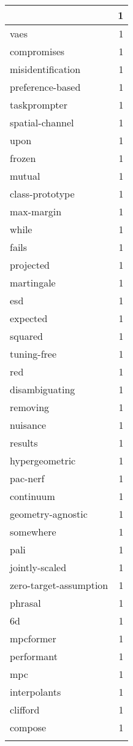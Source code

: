 \begin{table}[h]
\begin{tabular}{|l|r|}
{\hline
mmvae & 1 \\
\hline
vaes & 1 \\
\hline
compromises & 1 \\
\hline
misidentification & 1 \\
\hline
preference-based & 1 \\
\hline
taskprompter & 1 \\
\hline
spatial-channel & 1 \\
\hline
upon & 1 \\
\hline
frozen & 1 \\
\hline
mutual & 1 \\
\hline
class-prototype & 1 \\
\hline
max-margin & 1 \\
\hline
while & 1 \\
\hline
fails & 1 \\
\hline
projected & 1 \\
\hline
martingale & 1 \\
\hline
esd & 1 \\
\hline
expected & 1 \\
\hline
squared & 1 \\
\hline
tuning-free & 1 \\
\hline
red & 1 \\
\hline
disambiguating & 1 \\
\hline
removing & 1 \\
\hline
nuisance & 1 \\
\hline
results & 1 \\
\hline
hypergeometric & 1 \\
\hline
pac-nerf & 1 \\
\hline
continuum & 1 \\
\hline
geometry-agnostic & 1 \\
\hline
somewhere & 1 \\
\hline
pali & 1 \\
\hline
jointly-scaled & 1 \\
\hline
zero-target-assumption & 1 \\
\hline
phrasal & 1 \\
\hline
6d & 1 \\
\hline
mpcformer & 1 \\
\hline
performant & 1 \\
\hline
mpc & 1 \\
\hline
interpolants & 1 \\
\hline
clifford & 1 \\
\hline
compose & 1 \\
}
\end{tabular}
\end{table}
